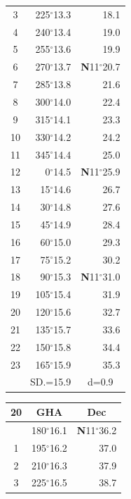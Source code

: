 \documentclass[10pt, a4paper]{report}
\begin{document}
\begin{scriptsize}
\begin{tabular*}{0.2\textwidth}[t]{@{\extracolsep{\fill}}|c|rr|}
3 & 225$^\circ$13.3 & \raisebox{0.24ex}{\boldmath$\cdot$~\boldmath$\cdot$~~}18.1\\
4 & 240$^\circ$13.4 & 19.0\\
5 & 255$^\circ$13.6 & 19.9\\[2Pt]
6 & 270$^\circ$13.7 & \textbf{N}11$^\circ$20.7\\
7 & 285$^\circ$13.8 & 21.6\\
8 & 300$^\circ$14.0 & 22.4\\
9 & 315$^\circ$14.1 & \raisebox{0.24ex}{\boldmath$\cdot$~\boldmath$\cdot$~~}23.3\\
10 & 330$^\circ$14.2 & 24.2\\
11 & 345$^\circ$14.4 & 25.0\\[2Pt]
12 & 0$^\circ$14.5 & \textbf{N}11$^\circ$25.9\\
13 & 15$^\circ$14.6 & 26.7\\
14 & 30$^\circ$14.8 & 27.6\\
15 & 45$^\circ$14.9 & \raisebox{0.24ex}{\boldmath$\cdot$~\boldmath$\cdot$~~}28.4\\
16 & 60$^\circ$15.0 & 29.3\\
17 & 75$^\circ$15.2 & 30.2\\[2Pt]
18 & 90$^\circ$15.3 & \textbf{N}11$^\circ$31.0\\
19 & 105$^\circ$15.4 & 31.9\\
20 & 120$^\circ$15.6 & 32.7\\
21 & 135$^\circ$15.7 & \raisebox{0.24ex}{\boldmath$\cdot$~\boldmath$\cdot$~~}33.6\\
22 & 150$^\circ$15.8 & 34.4\\
23 & 165$^\circ$15.9 & 35.3\\
\hline
\rule{0pt}{2.4ex} & \multicolumn{1}{c}{SD.=15.9} & \multicolumn{1}{c|}{d=0.9}\\
\hline
\end{tabular*}\noindent
\begin{tabular*}{0.2\textwidth}[t]{@{\extracolsep{\fill}}|c|rr|}
\hline
\multicolumn{1}{|c|}{\rule{0pt}{2.6ex}\textbf{20}} & \multicolumn{1}{c}{\textbf{GHA}} & \multicolumn{1}{c|}{\textbf{Dec}}\\
\hline\rule{0pt}{2.6ex}\noindent
0 & 180$^\circ$16.1 & \textbf{N}11$^\circ$36.2\\
1 & 195$^\circ$16.2 & 37.0\\
2 & 210$^\circ$16.3 & 37.9\\
3 & 225$^\circ$16.5 & \raisebox{0.24ex}{\boldmath$\cdot$~\boldmath$\cdot$~~}38.7\\

\end{tabular*}
\end{scriptsize}
\end{document}
